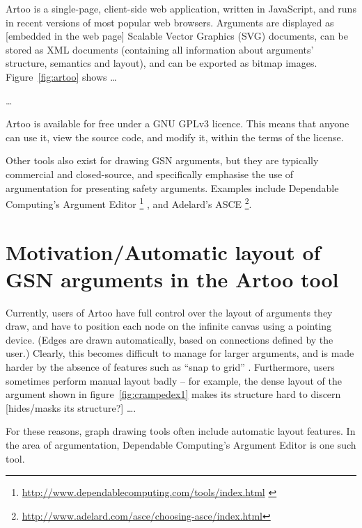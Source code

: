 Artoo is a single-page, client-side web application, written in JavaScript, and runs in recent versions of most popular web browsers.
Arguments are displayed as [embedded in the web page] Scalable Vector Graphics (SVG) documents, can be stored as XML documents (containing all information about arguments' structure, semantics  and layout), and can be exported as bitmap images.
Figure~\ref{fig:artoo} shows \ldots

\ldots

Artoo is available for free under a GNU GPLv3 licence.
This means that anyone can use it, view the source code, and modify it, within the terms of the license.

Other tools also exist for drawing GSN arguments, but they are typically commercial and closed-source,  and specifically emphasise the use of argumentation for presenting safety arguments.
Examples include Dependable Computing's Argument Editor
\footnote{\url{http://www.dependablecomputing.com/tools/index.html} \label{fn:depcomp}}
, and Adelard's ASCE 
\footnote{\url{http://www.adelard.com/asce/choosing-asce/index.html}}.


\section{Motivation/Automatic layout of GSN arguments in the Artoo tool}

Currently, users of Artoo have full control over the layout of arguments they draw, and have to position each node on the infinite canvas using a pointing device.
(Edges are drawn automatically, based on connections defined  by the user.)
Clearly, this becomes difficult to manage for larger arguments, and is made harder by the absence of features such as ``snap to grid'' .
Furthermore, users sometimes perform manual layout badly -- for example, the dense layout of the argument shown in figure~\ref{fig:crampedex1} makes its structure hard to discern [hides/masks its structure?] \ldots {}. \label{sec:cramped}

For these reasons, graph drawing tools often include automatic layout features.
In the area of argumentation, Dependable Computing's Argument Editor is one such tool.

